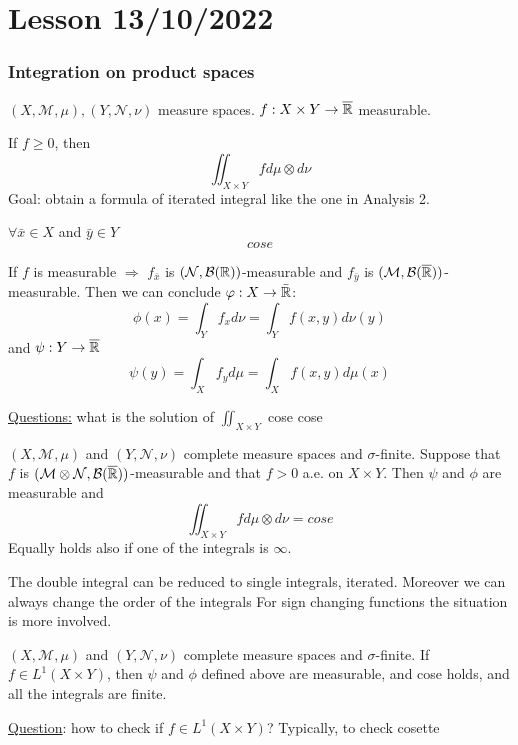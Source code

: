 \section{Lesson 13/10/2022}
\subsubsection*{Integration on product spaces}
\((X, \mathcal{M}, \mu), (Y, \mathcal{N},\nu)\) measure spaces. \(f : X \times Y \to \overline{\mathbb{R}}\) measurable.

If \(f \geq 0\), then 
\[
    \iint_{X \times Y} f d\mu\otimes d\nu
\]
Goal: obtain a formula of iterated integral like the one in Analysis 2.

\(\forall \bar{x} \in X\) and \(\bar{y} \in Y\)
\[
    cose
\]
\begin{proposition}
    If \(f\) is measurable \(\Rightarrow\) \(f_{\bar{x}}\) is \((\mathcal{N}, \mathcal{B}(\mathbb{R}))\)-measurable and \(f_{\bar{y}}\) is \((\mathcal{M}, \mathcal{B}(\overline{\mathbb{R}}))\)-measurable.
    Then we can conclude
    \( \varphi : X \to \bar{\mathbb{R}} \):
    \[
        \phi(x) = \int_Y f_x d\nu = \int_Y f(x,y) d\nu(y)
    \]
    and \(\psi : Y \to \overline{\mathbb{R}}\)
    \[
        \psi(y) = \int_X f_y d\mu = \int_X f(x,y) d\mu(x)
    \]
\end{proposition}
\underline{Questions:} what is the solution of \(\iint_{X \times Y}\)
cose cose
\begin{theorem}
    \((X, \mathcal{M}, \mu)\) and \((Y, \mathcal{N}, \nu)\) complete measure spaces and \(\sigma\)-finite.
    Suppose that \(f\) is \((\mathcal{M} \otimes \mathcal{N}, \mathcal{B}(\overline{\mathbb{R}}))\)-measurable and that \(f > 0\) a.e. on \(X \times Y\). Then \(\psi\) and \(\phi\) are measurable and
    \[
        \iint_{X \times Y} f d\mu \otimes d\nu = cose
    \]
    Equally holds also if one of the integrals is \(\infty\).
\end{theorem}
\begin{remark}
    The double integral can be reduced to single integrals, iterated. Moreover we can always change the order of the integrals
    For sign changing functions the situation is more involved.
\end{remark}
\begin{theorem}
    \((X, \mathcal{M}, \mu)\) and \((Y, \mathcal{N}, \nu)\) complete measure spaces and \(\sigma\)-finite.
    If \(f \in L^1(X \times Y)\), then \(\psi\) and \(\phi\) defined above are measurable, and cose holds, and all the integrals are finite.
\end{theorem}
\underline{Question}: how to check if \(f\in L^1(X \times Y)\)? Typically, to check cosette

